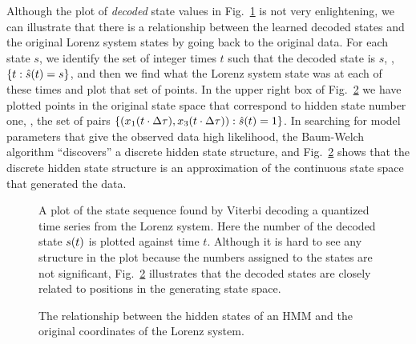  Although the plot of \emph{decoded} 
 state values in Fig.~\ref{fig:STSintro} is not very enlightening, we
 can illustrate that there is a relationship between the learned
 decoded states and the original Lorenz system states by going back to
 the original data.  For each state $s$, we identify the set of
 integer times $t$ such that the decoded state is $s$, \ie, $\left\{ t
   :{\hat s}{(t)} = s \right\}$, and then we find what the Lorenz
 system state was at each of these times and plot that set of points.
 In the upper right box of Fig.~\ref{fig:Statesintro} we have plotted
 points in the original state space that correspond to hidden state
 number one, \ie, the set of pairs $\left\{
   ({x_1}{(t\cdot\Delta\tau)},{x_3}{(t\cdot\Delta\tau)}) :{\hat
     s}{(t)} = 1 \right\}$.  In searching for model parameters that give
 the observed data high likelihood, the Baum-Welch algorithm
 ``discovers'' a discrete hidden state structure, and
 Fig.~\ref{fig:Statesintro} shows that the discrete hidden state
 structure is an approximation of the continuous state space that
 generated the data.
 \begin{figure}[htbp]
   \caption[A plot of a state sequence found by Viterbi decoding.]%
   {A plot of the state sequence found by Viterbi decoding a quantized
     time series from the Lorenz system.  Here the number of the
     decoded state ${s}{(t)}$ is plotted against time $t$.  Although
     it is hard to see any structure in the plot because the numbers
     assigned to the states are not significant,
     Fig.~\ref{fig:Statesintro} illustrates that the decoded states
     are closely related to positions in the generating state space.}
   \label{fig:STSintro}
 \end{figure}
 \begin{figure}[p]
   \caption[Relationship between states of HMM and Lorenz system.]%
   {The relationship between the hidden states of an HMM and the
     original coordinates of the Lorenz system.}
   \label{fig:Statesintro}
 \end{figure}


